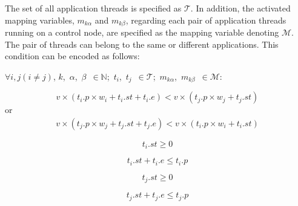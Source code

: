      The set of all application threads is specified as $\mathcal{T}$. In addition, the activated mapping variables, $m_{k \alpha}$ and $m_{k \beta}$, regarding each pair of application threads running on a control node, are specified as the mapping variable denoting $\mathcal{M}$. The pair of threads can belong to the same or different applications. This condition can be encoded as follows: \newline
    
    	$\forall i, j (i \neq j)$, $k$,~$\alpha$,~$\beta$~$\in\mathbb{N}$;~${t_i}$,~${t_j}$~$\in\mathcal{T}$;~$m_{k \alpha}$,~$m_{k \beta}$~$\in\mathcal{M} $:\newline
    	
    	
    \begin{equation}
    	 v \times ({t_i}.{p} \times {w_i} + {t_i}.{st} + {t_i}.{e}) < v \times ({t_j}.{p} \times {w_j} +  {t_j}.{st})
    	\label{eq6}
    \end{equation}
    \; \; \; \; \; \; \; \; \; \; \; \; \; \; \; \; \; \; \; \;\; \; \; \; \; \; \; \; \; \; \; \;\; \; \;\;\; \;or
    \begin{equation*}
    	\begin{split}
    	v \times ({t_j}.{p} \times {w_j} + {t_j}.{st} + {t_j}.{e}) < v \times ({t_i}.{p} \times {w_i} +  {t_i}.{st})
    	\label{eq}
    		\end{split}
    \end{equation*}
    
    \begin{equation}
    	 {t_i}.{st} \geq 0  
    	\label{eq7}
    \end{equation}
    
    \begin{equation}
    	{t_i}.{st} + {t_i}.{e} \leq {t_i}.{p}
    	\label{eq8}
    \end{equation}
    
    \begin{equation}
    	 {t_j}.{st} \geq 0  
    	\label{eq07}
    \end{equation}
    
    \begin{equation}
    	{t_j}.{st} + {t_j}.{e} \leq {t_j}.{p}
    	\label{eq08}
    \end{equation}
    

